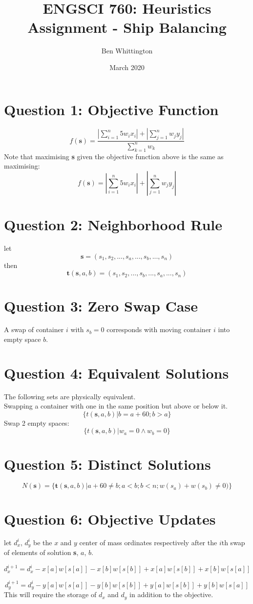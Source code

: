 \documentclass{article}
\title{ENGSCI 760: Heuristics Assignment - Ship Balancing}
\author{Ben Whittington}
\date{March 2020}
\begin{document}
	\maketitle
	\section*{Question 1: Objective Function}
	$$f(\textbf{s}) = \frac{|\sum_{i=1}^{n}5w_i x_i|+|\sum_{j=1}^{n}w_jy_j|}{\sum_{k=1}^{n}w_k}$$
	Note that maximising \textbf{s} given the objective function above is the same as maximising:
		$$f(\textbf{s}) = |\sum_{i=1}^{n}5w_i x_i|+|\sum_{j=1}^{n}w_jy_j|$$
	
	\section*{Question 2: Neighborhood Rule}
	let
	$$\mathbf{s} = (s_1,s_2,...,s_a,...,s_b,...,s_n)$$
	then
	$$\mathbf{t}(\mathbf{s},a,b) = (s_1,s_2,...,s_b,...,s_a,...,s_n)$$
	
	\section*{Question 3:  Zero Swap Case}
	A swap of container $i$ with $s_b=0$ corresponds with moving container $i$ into empty space $b$.
	
	\section*{Question 4: Equivalent Solutions}
	The following sets are physically equivalent.\\
	Swapping a container with one in the same position but above or below it.
	$$\{t(\textbf{s}, a, b) | b = a+60; b > a\}$$
	Swap 2 empty spaces:
	$$\{t(\textbf{s},a,b)|w_a=0\wedge w_b=0\}$$
	\section*{Question 5: Distinct Solutions}
	$$N(\mathbf{s})=\{\mathbf{t}(\mathbf{s},a,b)|a+60\ne b;a<b;b <n;w(s_a) + w(s_b)\ne 0)\}$$
	
	\section*{Question 6: Objective Updates}
	let $d_x^i$, $d_y^i$ be the $x$ and $y$ center of mass ordinates respectively after the $i$th swap of elements of solution \textbf{s}, $a$, $b$.
	
	$$d_x^{i+1} = d_x^i - x[a]w[s[a]] - x[b]w[s[b]] + x[a]w[s[b]]+x[b]w[s[a]]$$
	
	$$d_y^{i+1} = d_y^i - y[a]w[s[a]] - y[b]w[s[b]] + y[a]w[s[b]]+y[b]w[s[a]]$$
	This will require the storage of $d_x$ and $d_y$ in addition to the objective.
	
\end{document}
